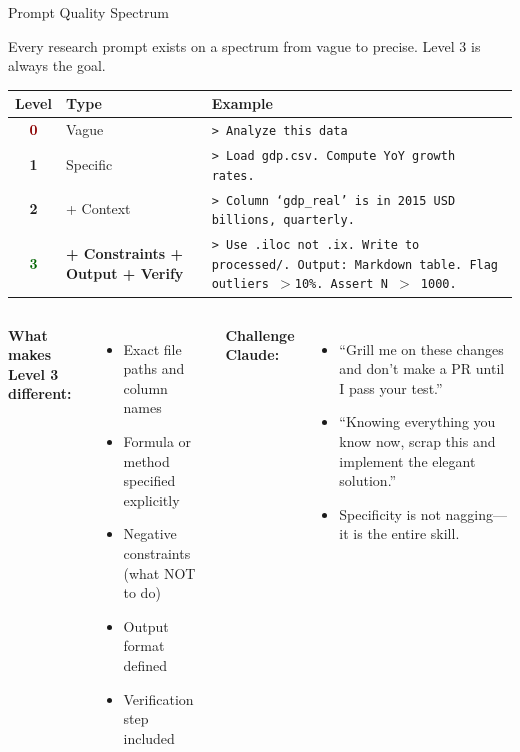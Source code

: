 \documentclass[aspectratio=169,10pt]{beamer}
\newcommand{\emphc}[1]{\textcolor{harvardcrimson}{#1}}
\newcommand{\boristip}[1]{%
  \tikz[baseline=(X.base)]{\node[fill=level4,text=white,
  rounded corners=2pt,inner sep=2pt,font=\tiny\bfseries](X){TIP #1};}}
\begin{document}
\begin{frame}[fragile]{Prompt Quality Spectrum}
\small

Every research prompt exists on a spectrum from vague to precise. \emphc{Level 3 is always the goal.}

\vspace{0.3em}
\small
\renewcommand{\arraystretch}{1.3}
\begin{tabular}{c p{3cm} p{7.5cm}}
\toprule
\textbf{Level} & \textbf{Type} & \textbf{Example} \\
\midrule
\textcolor{darkred}{\textbf{0}} & Vague & \texttt{> Analyze this data} \\
\textbf{1} & Specific & \texttt{> Load gdp.csv. Compute YoY growth rates.} \\
\textbf{2} & + Context & \texttt{> Column `gdp\_real' is in 2015 USD billions, quarterly.} \\
\rowcolor{softgreen!10}
\textcolor{darkgreen}{\textbf{3}} & \textbf{+ Constraints + Output + Verify} & \texttt{> Use .iloc not .ix. Write to processed/. Output: Markdown table. Flag outliers $>$10\%. Assert N $>$ 1000.} \\
\bottomrule
\end{tabular}

\vspace{0.3em}
\begin{columns}[T]
\textbf{What makes Level 3 different:}
\begin{itemize}\itemsep0pt
    \item Exact file paths and column names
    \item Formula or method specified explicitly
    \item Negative constraints (what NOT to do)
    \item Output format defined
    \item Verification step included
\end{itemize}

\boristip{6} \textbf{Challenge Claude:}
\begin{itemize}\itemsep0pt
    \item ``Grill me on these changes and don't make a PR until I pass your test.''
    \item ``Knowing everything you know now, scrap this and implement the elegant solution.''
    \item Specificity is not nagging---it is the entire skill.
\end{itemize}
\end{columns}
\end{frame}
\end{document}
